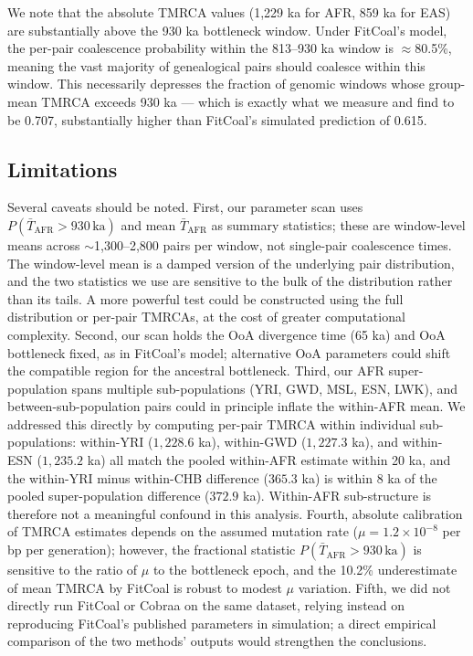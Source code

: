 We note that the absolute TMRCA values (1,229 ka for AFR, 859 ka for EAS) are substantially above the 930 ka bottleneck window. Under FitCoal's model, the per-pair coalescence probability within the 813--930 ka window is $\approx$80.5\%, meaning the vast majority of genealogical pairs should coalesce within this window. This necessarily depresses the fraction of genomic windows whose group-mean TMRCA exceeds 930 ka --- which is exactly what we measure and find to be 0.707, substantially higher than FitCoal's simulated prediction of 0.615.

\subsection*{Limitations}

Several caveats should be noted. First, our parameter scan uses $P(\bar{T}_\text{AFR} > 930\,\text{ka})$ and mean $\bar{T}_\text{AFR}$ as summary statistics; these are window-level means across $\sim$1,300--2,800 pairs per window, not single-pair coalescence times. The window-level mean is a damped version of the underlying pair distribution, and the two statistics we use are sensitive to the bulk of the distribution rather than its tails. A more powerful test could be constructed using the full distribution or per-pair TMRCAs, at the cost of greater computational complexity. Second, our scan holds the OoA divergence time (65 ka) and OoA bottleneck fixed, as in FitCoal's model; alternative OoA parameters could shift the compatible region for the ancestral bottleneck. Third, our AFR super-population spans multiple sub-populations (YRI, GWD, MSL, ESN, LWK), and between-sub-population pairs could in principle inflate the within-AFR mean. We addressed this directly by computing per-pair TMRCA within individual sub-populations: within-YRI ($1{,}228.6$ ka), within-GWD ($1{,}227.3$ ka), and within-ESN ($1{,}235.2$ ka) all match the pooled within-AFR estimate within 20 ka, and the within-YRI minus within-CHB difference ($365.3$ ka) is within 8 ka of the pooled super-population difference ($372.9$ ka). Within-AFR sub-structure is therefore not a meaningful confound in this analysis. Fourth, absolute calibration of TMRCA estimates depends on the assumed mutation rate ($\mu = 1.2 \times 10^{-8}$ per bp per generation); however, the fractional statistic $P(\bar{T}_\text{AFR} > 930\,\text{ka})$ is sensitive to the ratio of $\mu$ to the bottleneck epoch, and the 10.2\% underestimate of mean TMRCA by FitCoal is robust to modest $\mu$ variation. Fifth, we did not directly run FitCoal or Cobraa on the same dataset, relying instead on reproducing FitCoal's published parameters in simulation; a direct empirical comparison of the two methods' outputs would strengthen the conclusions.

